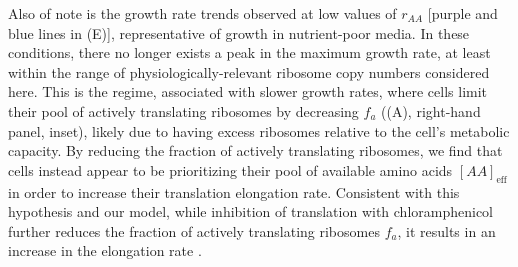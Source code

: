 Also of note is the growth rate trends observed at low values of $r_{AA}$
[purple and blue lines in (E)], representative of
growth in nutrient-poor media. In these conditions, there no longer exists a
peak in the maximum growth rate, at least within the range of
physiologically-relevant ribosome copy numbers considered here. This is the
regime, associated with slower growth rates, where cells limit their pool of
actively translating ribosomes by decreasing $f_a$ ((A),
right-hand panel, inset), likely due to having excess ribosomes relative to the
cell's metabolic capacity. By reducing the fraction of actively translating
ribosomes, we find that cells instead appear to be prioritizing their pool of
available amino acids $[AA]_\text{eff}$ in order to increase their translation
elongation rate. Consistent with this hypothesis and our model, while inhibition
of translation with chloramphenicol further reduces the fraction of actively
translating ribosomes $f_a$, it results in an increase in the elongation rate
\citep{dai2016}.

